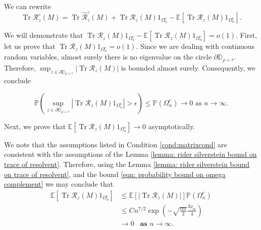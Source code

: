 \documentclass[12pt]{amsart}
\theoremstyle{plain}
\theoremstyle{definition}
\newcommand{\Tr}{\operatorname{Tr}}
\begin{document}
We can rewrite
$$\Tr{\mathcal{R}}_{z}^{\circ}(M)=\Tr \hat{\mathcal{R}}_{z}^{\circ}(M)+\Tr \mathcal{R}_{z}(M)1_{\Omega_{n}^c}-\mathbb{E}[\Tr \mathcal{R}_{z}(M)1_{\Omega_{n}^c}].$$

We will demonstrate that $\Tr \mathcal{R}_{z}(M)1_{\Omega_{n}^c}-\mathbb{E}[\Tr \mathcal{R}_{z}(M)1_{\Omega_{n}^c}]=o(1).$ First, let us prove that $\Tr \mathcal{R}_{z}(M)1_{\Omega_{n}^c}=o(1).$ Since we are dealing with continuous random variables, almost surely there is no eigenvalue on the circle $\partial\mathbb{D}_{\rho+\tau}.$ Therefore, $\sup_{z\in \partial\mathbb{D}_{\rho+\tau}}|\Tr \mathcal{R}_{z}(M)|$ is bounded almost surely. Consequently, we conclude

$$\mathbb{P}\left(\sup_{z\in \partial \mathbb{D}_{\rho+\tau}}|\Tr \mathcal{R}_{z}(M)1_{\Omega_{n}^c}|>\epsilon \right)\leq \mathbb{P}(\Omega_n^c)\rightarrow 0 \text{ as } n \rightarrow \infty.$$

Next, we prove that $\mathbb{E}[\Tr \mathcal{R}_{z}(M)1_{\Omega_{n}^c}] \rightarrow 0$ asymptotically. 


We note that the assumptions listed in Condition \ref{cond:matrixcond} are consistent with the assumptions of the Lemma \ref{lemma: rider silverstein bound on trace of resolvent}. Therefore, using the Lemma \ref{lemma: rider silverstein bound on trace of resolvent}, and the bound \eqref{eqn: probability bound on omega complement} we may conclude that 
\begin{align*}
    \mathbb{E}[\Tr \mathcal{R}_{z}(M)1_{\Omega_{n}^c}]&\leq \mathbb{E}[|\Tr \mathcal{R}_{z}(M)|]\mathbb{P}(\Omega_{n}^{c})\\
    &\leq C n^{7/2}\exp\left(-\sqrt{\frac{\alpha n}{2}} \frac{3 \rho_{m}}{4}\right)\\
    &\to 0\;\;\;\textbf{as $n\to\infty$.}
\end{align*}

\end{document}
